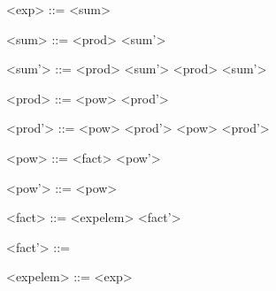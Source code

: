 \begin{grammarEx}
	<exp> ::= <sum>
	
	<sum> ::= <prod> <sum'>
	
	<sum'> ::= \lit{\opplus{}} <prod> <sum'>
	\alt \lit{\opminus{}} <prod> <sum'>
	\alt \textemptyword{}

	<prod> ::= <pow> <prod'>
	
	<prod'> ::= \lit{\opmult{}} <pow> <prod'>
	\alt \lit{\opdiv{}} <pow> <prod'>
	\alt \textemptyword{}

	<pow> ::= <fact> <pow'>
	
	<pow'> ::= \lit{\oppow{}} <pow>
	\alt \textemptyword{}

	<fact> ::= <exp\textunderscore elem> <fact'>
	
	<fact'> ::= \lit{!}
	\alt \textemptyword{}

	<exp\textunderscore elem> ::= 
	\alt {}
	\alt \lit{(} <exp> \lit{)}
\end{grammarEx}